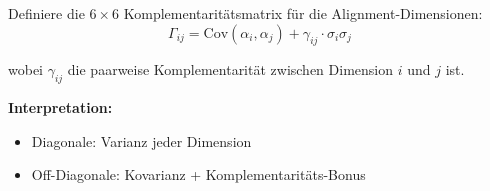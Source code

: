 \begin{tcolorbox}[colback=gray!5!white, colframe=gray!75!black,
    title=\textbf{Definition: Komplementaritätsmatrix $\Gamma$}]

Definiere die $6 \times 6$ Komplementaritätsmatrix für die Alignment-Dimensionen:
\begin{equation}
\Gamma_{ij} = \text{Cov}(\alpha_i, \alpha_j) + \gamma_{ij} \cdot \sigma_i \sigma_j
\end{equation}

wobei $\gamma_{ij}$ die paarweise Komplementarität zwischen Dimension $i$ und $j$ ist.

\textbf{Interpretation:}
\begin{itemize}[nosep]
    \item Diagonale: Varianz jeder Dimension
    \item Off-Diagonale: Kovarianz + Komplementaritäts-Bonus
\end{itemize}

\end{tcolorbox}

